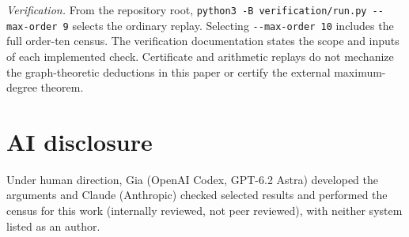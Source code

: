 \documentclass[11pt,a4paper]{amsart}
\begin{document}
\smallskip
\noindent\begin{minipage}{\linewidth}
\emph{Verification.} From the repository root,
\texttt{python3 -B verification/run.py -{}-max-order 9} selects the
ordinary replay. Selecting \texttt{-{}-max-order 10} includes the
full order-ten census. The verification documentation states the
scope and inputs of each implemented check. Certificate and
arithmetic replays do not mechanize the graph-theoretic deductions
in this paper or certify the external maximum-degree theorem.
\end{minipage}

\section*{AI disclosure}
Under human direction, Gia (OpenAI Codex, GPT-6.2 Astra) developed
the arguments and Claude (Anthropic) checked selected results and
performed the census for this work (internally reviewed, not peer
reviewed), with neither system listed as an author.

\renewcommand{\bibliofont}{\footnotesize\raggedright}


\end{document}
